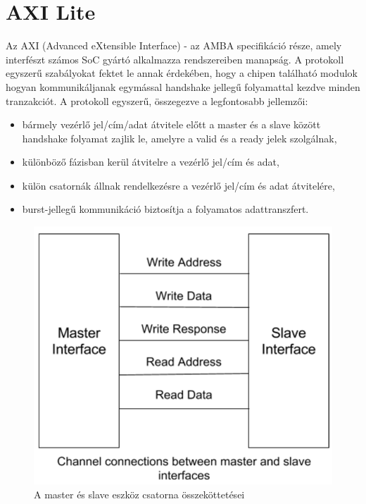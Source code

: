 \documentclass[a4paper,11pt]{article}
\begin{document}
\section{AXI Lite}
Az AXI (Advanced eXtensible Interface) - az AMBA specifikáció része, amely interfészt számos SoC gyártó alkalmazza rendszereiben manapság. A protokoll egyszerű szabályokat fektet le annak érdekében, hogy a chipen található modulok hogyan kommunikáljanak egymással handshake jellegű folyamattal kezdve minden tranzakciót. A protokoll egyszerű, összegezve a legfontosabb jellemzői:
\begin{itemize}
	\item bármely vezérlő jel/cím/adat átvitele előtt a master és a slave között handshake folyamat zajlik le, amelyre a valid és a ready jelek szolgálnak,
	\item különböző fázisban kerül átvitelre a vezérlő jel/cím és adat,
	\item külön csatornák állnak rendelkezésre a vezérlő jel/cím és adat átvitelére,
	\item burst-jellegű kommunikáció biztosítja a folyamatos adattranszfert.
\end{itemize}
\begin{figure}[H]
	\begin{center}
	\includegraphics[scale=0.3]{axi_teo.png}
	\caption{A master és slave eszköz csatorna összeköttetései}
	\label{fig:axi_teo}
	\end{center}
\end{figure}
\end{document}
